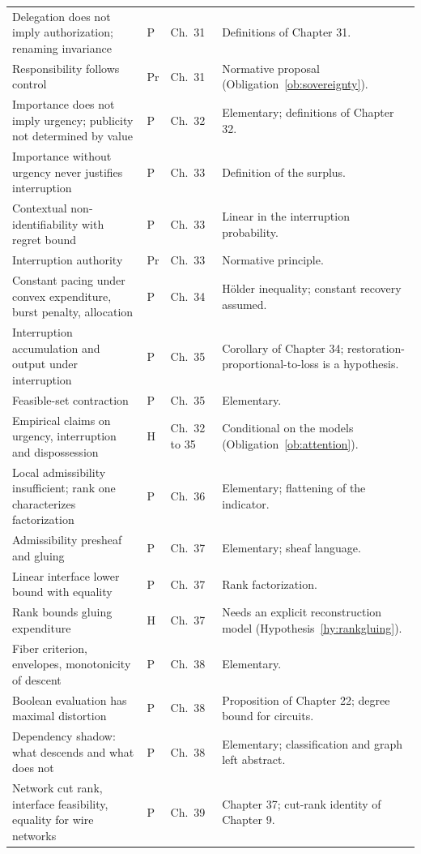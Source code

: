 \documentclass[11pt,letterpaper]{report}
\theoremstyle{plain}
\theoremstyle{definition}
\theoremstyle{remark}
\begin{document}
{\begin{longtable}{p{}p{}p{}p{}}
Delegation does not imply authorization; renaming invariance & P & Ch.\ 31 & Definitions of Chapter 31.\\
Responsibility follows control & Pr & Ch.\ 31 & Normative proposal (Obligation~\ref{ob:sovereignty}).\\
Importance does not imply urgency; publicity not determined by value & P & Ch.\ 32 & Elementary; definitions of Chapter 32.\\
Importance without urgency never justifies interruption & P & Ch.\ 33 & Definition of the surplus.\\
Contextual non-identifiability with regret bound & P & Ch.\ 33 & Linear in the interruption probability.\\
Interruption authority & Pr & Ch.\ 33 & Normative principle.\\
Constant pacing under convex expenditure, burst penalty, allocation & P & Ch.\ 34 & H\"older inequality; constant recovery assumed.\\
Interruption accumulation and output under interruption & P & Ch.\ 35 & Corollary of Chapter 34; restoration-proportional-to-loss is a hypothesis.\\
Feasible-set contraction & P & Ch.\ 35 & Elementary.\\
Empirical claims on urgency, interruption and dispossession & H & Ch.\ 32 to 35 & Conditional on the models (Obligation~\ref{ob:attention}).\\
Local admissibility insufficient; rank one characterizes factorization & P & Ch.\ 36 & Elementary; flattening of the indicator.\\
Admissibility presheaf and gluing & P & Ch.\ 37 & Elementary; sheaf language.\\
Linear interface lower bound with equality & P & Ch.\ 37 & Rank factorization.\\
Rank bounds gluing expenditure & H & Ch.\ 37 & Needs an explicit reconstruction model (Hypothesis~\ref{hy:rankgluing}).\\
Fiber criterion, envelopes, monotonicity of descent & P & Ch.\ 38 & Elementary.\\
Boolean evaluation has maximal distortion & P & Ch.\ 38 & Proposition of Chapter 22; degree bound for circuits.\\
Dependency shadow: what descends and what does not & P & Ch.\ 38 & Elementary; classification and graph left abstract.\\
Network cut rank, interface feasibility, equality for wire networks & P & Ch.\ 39 & Chapter 37; cut-rank identity of Chapter 9.\\

\end{longtable}}
\end{document}

